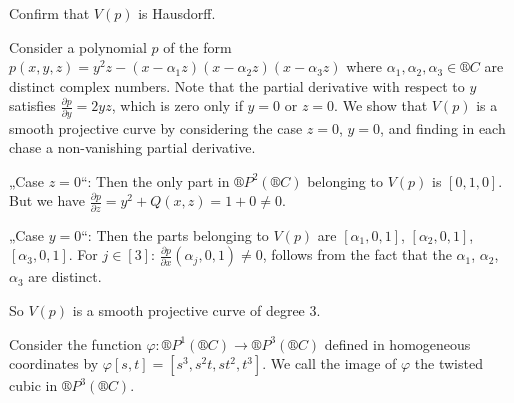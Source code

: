 \documentclass[12pt]{article}					%
\begin{document}
\begin{priklad}
	Confirm that $V(p)$ is Hausdorff.
\end{priklad}

\begin{priklady}
	Consider a polynomial $p$ of the form $p(x, y, z) = y^2z - (x - α_1z)(x - α_2z)(x - α_3z)$ where $α_1, α_2, α_3 \in ®C$ are distinct complex numbers. Note that the partial derivative with respect to $y$ satisfies $\frac{\partial p}{\partial y} = 2yz$, which is zero only if $y = 0$ or $z = 0$. We show that $V(p)$ is a smooth projective curve by considering the case $z = 0$, $y = 0$, and finding in each chase a non-vanishing partial derivative.

	„Case $z = 0$“: Then the only part in $®P^2(®C)$ belonging to $V(p)$ is $[0, 1, 0]$. But we have $\frac{\partial p}{\partial z} = y^2 + Q(x, z) = 1 + 0 ≠ 0$.

	„Case $y = 0$“: Then the parts belonging to $V(p)$ are $[α_1, 0, 1]$, $[α_2, 0, 1]$, $[α_3, 0, 1]$. For $j \in [3]$: $\frac{\partial p}{\partial x}(α_j, 0, 1) ≠ 0$, follows from the fact that the $α_1$, $α_2$, $α_3$ are distinct.

	So $V(p)$ is a smooth projective curve of degree 3.
\end{priklady}

\begin{priklady}
	Consider the function $φ: ®P^1(®C) \rightarrow ®P^3(®C)$ defined in homogeneous coordinates by $φ[s, t] = [s^3, s^2t, st^2, t^3]$. We call the image of $φ$ the twisted cubic in $®P^3(®C)$.
\end{priklady}
\end{document}
